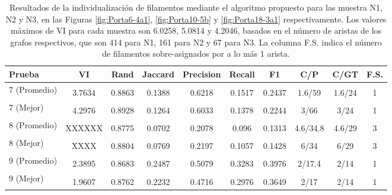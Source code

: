 \begin{table}[h]
    \centering
    \begin{tabular}{|l|c|c|c|c|c|c|c|c|c|}
    \hline
          Prueba & VI & Rand & Jaccard & Precision & Recall & F1 & C/P & C/GT & F.S. \\ \hline
         \multirow{2}{1.9cm}{7 (Promedio)}
          &&&&&&&&&\\  
        & 3.7634 & 0.8863 & 0.1388 & 0.6218 & 0.1517 & 0.2437 & 1.6/59 & 1.6/24 & 1\\
         \multirow{2}{1.9cm}{7 (Mejor)}
         &&&&&&&&&\\
         & 4.2976 & 0.8928 & 0.1264 & 0.6033 & 0.1378 & 0.2244 & 3/66 & 3/24 & 1 \\
         \multirow{2}{1.9cm}{8 (Promedio)}
          &&&&&&&&&\\  
        & XXXXXX & 0.8775 & 0.0702 & 0.2078 & 0.096 & 0.1313 & 4.6/34.8 & 4.6/29 & 3\\
         \multirow{2}{1.9cm}{8 (Mejor)}
         &&&&&&&&&\\
         & XXXX & 0.8804 & 0.0769 & 0.2197 & 0.1057 & 0.1428 & 6/34 & 6/29 & 3 \\
         \multirow{2}{1.9cm}{9 (Promedio)}
          &&&&&&&&&\\  
        & 2.3895 & 0.8683 & 0.2487 & 0.5079 & 0.3283 & 0.3976 & 2/17.4 & 2/14 & 1\\
         \multirow{2}{1.9cm}{9 (Mejor)}
         &&&&&&&&&\\
         & 1.9607 & 0.8762 & 0.2232 & 0.4716 & 0.2976 & 0.3649 & 2/17 & 2/14 & 1 \\
         \hline
    \end{tabular}
    \caption{Resultados de la individualizaci\'on de filamentos mediante el algoritmo propuesto para las muestra N1, N2 y N3, en las Figuras \ref{fig:Porta6-4a1}, \ref{fig:Porta10-5b} y \ref{fig:Porta18-3a1} respectivamente. Los valores m\'aximos de VI para cada muestra son 6.0258, 5.0814 y 4.2046, basados en el n\'umero de aristas de los grafos respectivos, que son 414 para N1, 161 para N2 y 67 para N3. La columna F.S. indica el n\'umero de filamentos sobre-asignados por a lo m\'as 1 arista.}
    \label{tab:neuronResults}
\end{table}


